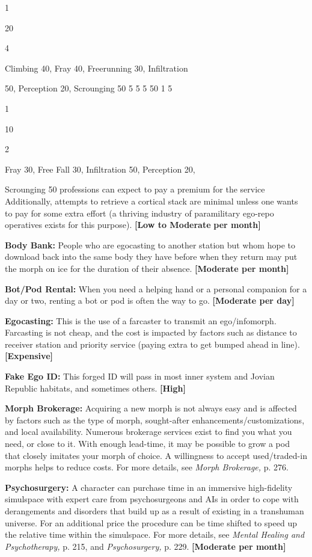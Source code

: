 1

20

4

Climbing 40, Fray 40, Freerunning 30, Infiltration 

50, Perception 20, Scrounging 50
5
5
5
50
1
5

1

10

2

Fray 30, Free Fall 30, Infiltration 50, Perception 20, 

Scrounging 50
professions can expect to pay a premium for the service
Additionally, attempts to retrieve a cortical stack
are minimal unless one wants to pay for some extra 
effort (a thriving industry of paramilitary ego-repo 
operatives exists for this purpose). \textbf{[Low to Moderate }
\textbf{per month]}

\textbf{Body Bank:} People who are egocasting to another 
station but whom hope to download back into the 
same body they have before when they return may 
put the morph on ice for the duration of their absence. 
\textbf{[Moderate per month]}

\textbf{Bot/Pod Rental:} When you need a helping hand or 
a personal companion for a day or two, renting a bot 
or pod is often the way to go. \textbf{[Moderate per day]}

\textbf{Egocasting:} This is the use of a farcaster to transmit
an ego/infomorph. Farcasting is not cheap, and
the cost is impacted by factors such as distance to 
receiver station and priority service (paying extra to 
get bumped ahead in line). \textbf{[Expensive]}

\textbf{Fake Ego ID:} This forged ID will pass in most inner 
system and Jovian Republic habitats, and sometimes 
others. \textbf{[High]}

\textbf{Morph Brokerage:} Acquiring a new morph is not 
always easy and is affected by factors such as the type 
of morph, sought-after enhancements/customizations, 
and local availability. Numerous brokerage services 
exist to find you what you need, or close to it. With 
enough lead-time, it may be possible to grow a pod 
that closely imitates your morph of choice. A willingness
to accept used/traded-in morphs helps to reduce
costs. For more details, see \textit{Morph Brokerage,} p. 276.

\textbf{Psychosurgery:} A character can purchase time in an 
immersive high-fidelity simulspace with expert care 
from psychosurgeons and AIs in order to cope with 
derangements and disorders that build up as a result 
of existing in a transhuman universe. For an additional
price the procedure can be time shifted to speed
up the relative time within the simulspace. For more 
details, see \textit{Mental Healing and Psychotherapy,} p. 215, 
and \textit{Psychosurgery,} p. 229. \textbf{[Moderate per month]}

